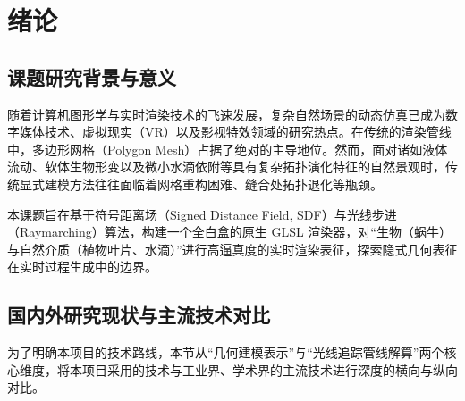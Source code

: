 \documentclass[11pt, a4paper, oneside]{report}
\begin{document}
\tableofcontents

\chapter{绪论}

\section{课题研究背景与意义}
随着计算机图形学与实时渲染技术的飞速发展，复杂自然场景的动态仿真已成为数字媒体技术、虚拟现实（VR）以及影视特效领域的研究热点。在传统的渲染管线中，多边形网格（Polygon Mesh）占据了绝对的主导地位。然而，面对诸如液体流动、软体生物形变以及微小水滴依附等具有复杂拓扑演化特征的自然景观时，传统显式建模方法往往面临着网格重构困难、缝合处拓扑退化等瓶颈。

本课题旨在基于符号距离场（Signed Distance Field, SDF）与光线步进（Raymarching）算法，构建一个全白盒的原生 GLSL 渲染器，对“生物（蜗牛）与自然介质（植物叶片、水滴）”进行高逼真度的实时渲染表征，探索隐式几何表征在实时过程生成中的边界。

\section{国内外研究现状与主流技术对比}
为了明确本项目的技术路线，本节从“几何建模表示”与“光线追踪管线解算”两个核心维度，将本项目采用的技术与工业界、学术界的主流技术进行深度的横向与纵向对比。
\end{document}
